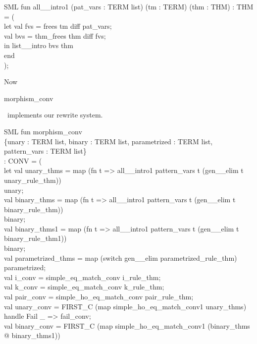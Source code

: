 \documentclass[11pt,a4paper]{article}
\begin{document}
\begin{GFT}{SML}
\+fun \PrNL{}all\_\PrLF{}\_intro1\PrNN{} (pat\_vars : TERM list) (tm : TERM) (thm : THM) : THM = (\\
\+	let	val fvs = frees tm diff pat\_vars;\\
\+		val bvs = thm\_frees thm diff fvs;\\
\+	in	list\_\PrLF{}\_intro bvs thm\\
\+	end\\
\+);\\
\end{GFT}
Now
\begin{INLINEFT}%
\+morphism\Backslash{}\_conv\\
\end{INLINEFT}%
\ implements our rewrite system.
\begin{GFT}{SML}
\+fun \PrNL{}morphism\_conv\PrNN{}\\
\+	\{unary : TERM list, binary : TERM list, parametrized : TERM list, pattern\_vars : TERM list\}\\
\+	: CONV = (\\
\+	let	val unary\_thms = map (fn t => all\_\PrLF{}\_intro1 pattern\_vars t (gen\_\PrLF{}\_elim t unary\_rule\_thm))\\
\+			unary;\\
\+		val binary\_thms = map (fn t => all\_\PrLF{}\_intro1 pattern\_vars t (gen\_\PrLF{}\_elim t binary\_rule\_thm))\\
\+			binary;\\
\+		val binary\_thms1 = map (fn t => all\_\PrLF{}\_intro1 pattern\_vars t (gen\_\PrLF{}\_elim t binary\_rule\_thm1))\\
\+			binary;\\
\+		val parametrized\_thms = map (switch gen\_\PrLF{}\_elim parametrized\_rule\_thm)\\
\+			parametrized;\\
\+		val i\_conv = simple\_eq\_match\_conv i\_rule\_thm;\\
\+		val k\_conv = simple\_eq\_match\_conv k\_rule\_thm;\\
\+		val pair\_conv = simple\_ho\_eq\_match\_conv pair\_rule\_thm;\\
\+		val unary\_conv = FIRST\_C (map simple\_ho\_eq\_match\_conv1 unary\_thms)\\
\+			handle Fail \_ => fail\_conv;\\
\+		val binary\_conv = FIRST\_C (map simple\_ho\_eq\_match\_conv1 (binary\_thms @ binary\_thms1))\\

\end{GFT}
\end{document}
